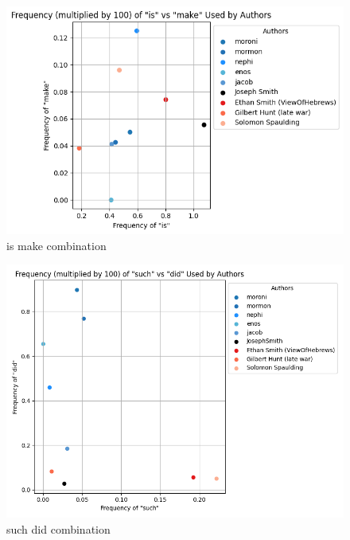 \documentclass[
  letterpaper,
  DIV=11,
  numbers=noendperiod]{scrartcl}
\begin{document}
\begin{figure}

{\centering \includegraphics{Graphs/Word Comparisons/is_make_output.png}

}

\caption{is make combination}

\end{figure}

\begin{figure}

{\centering \includegraphics{Graphs/Word Comparisons/such_did_output.png}

}

\caption{such did combination}

\end{figure}
\end{document}
